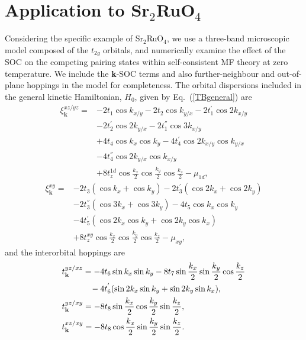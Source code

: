 \documentclass[%
reprint,
superscriptaddress,
 amsmath,amssymb,
 aps,
prb,
nobalancelastpage,
]{revtex4-2}
\newcommand{\Sr}{\texorpdfstring{Sr$_{2}$RuO$_{4}$}{Sr2RuO4}}
\begin{document}
\section{\label{Four}Application to \protect\Sr}


Considering the specific example of Sr$_{2}$RuO$_{4}$, we use a three-band microscopic model composed of the $t_{2g}$ orbitals, and numerically examine the effect of the SOC on the competing pairing states within self-consistent MF theory at zero temperature. We include the \textbf{k}-SOC terms and also further-neighbour and out-of-plane hoppings in the model for completeness. The orbital dispersions included in the general kinetic Hamiltonian, $H_{0}$, given by Eq.~(\ref{TBgeneral}) are
\begin{equation}
    \begin{aligned}
    \xi_{\textbf{k}}^{xz/yz} = &-2t_{1}\cos{k_{x/y}} - 2t_{2}\cos{k_{y/x}} - 2t_{1}^{'}\cos{2k_{x/y}} \\&-2t_{2}^{'}\cos{2k_{y/x}} -2t_{1}^{''}\cos{3k_{x/y}} \\&+ 4t_{4}\cos{k_x}\cos{k_y}-4t_{4}^{'}\cos{2k_{x/y}}\cos{k_{y/x}} \\&- 4t_{4}^{''}\cos{2k_{y/x}}\cos{k_{x/y}} \\&+ 8t_{z}^{1d}\cos{\frac{k_x}{2}}\cos{\frac{k_y}{2}}\cos{\frac{k_z}{2}} - \mu_{1d},
    \end{aligned}
\end{equation}
\begin{equation}
    \begin{aligned}
    \xi_{\textbf{k}}^{xy} = &-2t_{3}(\cos{k_x}+\cos{k_y}) -2t_{3}^{'}(\cos{2k_x}+\cos{2k_y})\\
    &-2t_{3}^{''}(\cos{3k_x}+\cos{3k_y}) -4t_{5}\cos{k_x}\cos{k_y}\\
    &-4t_{5}^{'}(\cos{2k_{x}}\cos{k_y}+\cos{2k_{y}}\cos{k_{x}})\\
    &+8t_{z}^{xy}\cos{\frac{k_x}{2}}\cos{\frac{k_y}{2}}\cos{\frac{k_z}{2}} - \mu_{xy},
    \end{aligned}
\end{equation}
and the interorbital hoppings are
\begin{equation}    \label{interorbhoppings}
\begin{aligned}
    &t_{\textbf{k}}^{yz/xz} = -4t_{6}\sin{k_x}\sin{k_y} -8t_{7}\sin{\frac{k_x}{2}}\sin{\frac{k_y}{2}}\cos{\frac{k_z}{2}}\\
    &\hspace{12mm}-4t_{6}^{'}(\sin{2k_x}\sin{k_y}+\sin{2k_y}\sin{k_x}),\\
    &t_{\textbf{k}}^{yz/xy} = -8t_{8}\sin{\frac{k_x}{2}}\cos{\frac{k_y}{2}}\sin{\frac{k_z}{2}},\\
    &t_{\textbf{k}}^{xz/xy} = -8t_{8}\cos{\frac{k_x}{2}}\sin{\frac{k_y}{2}}\sin{\frac{k_z}{2}}.
\end{aligned}
\end{equation}
\end{document}
